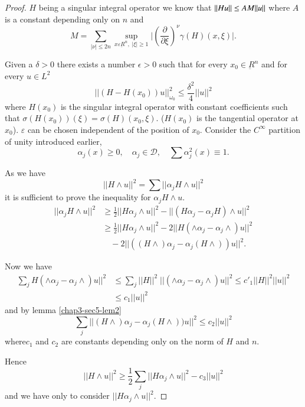 \begin{proof}%
$H$ being a singular integral operator we know that $||Hu ||\leq\break AM
   ||u|| $ where $A$ is a constant depending only on $n$ and  
$$
M = \sum\limits_{|\nu| \leq 2n} \sup\limits_{x \varepsilon
  \underbar{R}^n, \; |\xi| \ge 1} \big|
(\frac{\partial}{\partial\xi})^\nu \gamma (H) (x, \xi)\big|.  
$$\pageoriginale

Given a $\delta > 0 $ there exists a number $\epsilon  > 0 $ such
that for every $x_0 \in \underbar{R}^n$ and for every $u
\in L^2$  
\begin{equation}
||(H-H(x_0)) u ||^2_{\omega_0}\leq \frac{\delta^2}{4}||u||^2
\tag{5.18} \label{chap3-eq5.18}
 \end{equation} 
 where $H(x_0)$ is the singular integral operator with constant
 coefficients such that $\sigma(H(x_0))(\xi) = \sigma(H) (x_0,
 \xi)$. ($H(x_0)$ is the tangential operator at $x_0$). $\varepsilon$ 
 can be chosen independent of the position of $x_0$. Consider the
 $C^\infty$ partition of unity introduced earlier,  
 $$
 \alpha_j(x) \geq 0, \quad \alpha_j \in \mathscr{D}, \quad \sum
 \alpha^2_j   (x) \equiv 1. 
 $$

 As we have 
 $$
 || H \wedge u||^2 = \sum ||\alpha_j H \wedge  u ||^2  
 $$
 it is sufficient to prove the inequality for $\alpha_j H \wedge u$. 
 \begin{align*}
 ||\alpha_j H \wedge u ||^2 & \geq \frac{1}{2} || H \alpha_j \wedge u
 ||^2 - ||(H \alpha_j - \alpha_j H ) \wedge u ||^2 \\ 
 & \geq \frac{1}{2}|| H \alpha_j \wedge u ||^2 - 2 ||H(\wedge
 \alpha_j - \alpha_j \wedge ) u ||^2\\
&\quad - 2 || ((H \wedge ) \alpha_j -
 \alpha_j (H \wedge )) u ||^2.  
 \end{align*}

 Now  we have 
 \begin{align*}
 \sum\limits_{j} H ( \wedge \alpha_j - \alpha_j \wedge ) u ||^2 &
 \leq \sum_j ||H ||^2 \; || (\wedge \alpha_j -\alpha_j \wedge ) u ||^2 \leq
 c'_1 || H ||^2  || u ||^2 \\ 
&  \leq c_1 ||u||^2
 \end{align*} 
and by lemma \ref{chap3-sec5-lem2}
$$
\sum\limits_{j} || (H  \wedge) \alpha_j - \alpha_j (H \wedge)) u ||^2
\leq c_2 ||u||^2  
$$ 
where\pageoriginale $c_1$ and $c_2$ are constants depending only on
the norm of $H$ and $n$.   

Hence 
\begin{equation}
||H \wedge u||^2 \geq \frac{1}{2} \sum\limits_{j}||H \alpha_j \wedge
u ||^2 - c_3 ||u||^2 \tag{5.21} \label{chap3-eq5.21}
\end{equation} 
and we have only to consider $||H \alpha_j \wedge u ||^2$. 
  

\end{proof}
